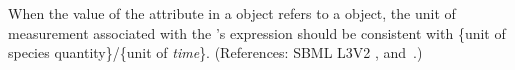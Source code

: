 When the value of the attribute  in a \RateRule object
refers to a \Species object, the unit of measurement associated with the
\RateRule's  expression should be consistent with \{unit of
species quantity\}/\{unit of \emph{time}\}.  (References: SBML L3V2
, 
and~.)
